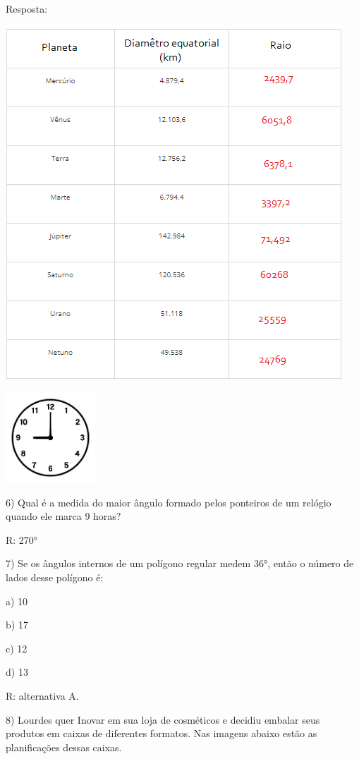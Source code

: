 Resposta:

\includegraphics[width=4.96875in,height=5.22917in]{./imgSAEB_6_MAT/media/image49.png}

\includegraphics[width=1.32083in,height=1.32083in]{./imgSAEB_6_MAT/media/image50.jpeg}

6) Qual é a medida do maior ângulo formado pelos ponteiros de um relógio
quando ele marca 9 horas?

R: 270°

7) Se os ângulos internos de um polígono regular medem 36°, então o
número de lados desse polígono é:

a) 10

b) 17

c) 12

d) 13

R: alternativa A.

8) Lourdes quer Inovar em sua loja de cosméticos e decidiu embalar seus
produtos em caixas de diferentes formatos. Nas imagens abaixo estão as
planificações dessas caixas.

